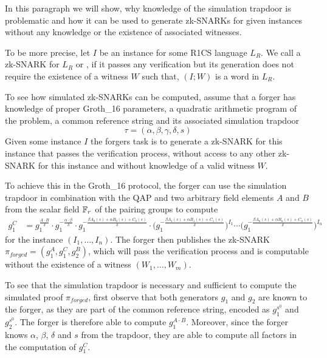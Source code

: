 In this paragraph we will show, why knowledge of the simulation trapdoor is problematic and how it can be used to generate zk-SNARKs for given instances without any knowledge or the existence of associated witnesses. 

To be more precise, let $I$ be an instance for some R1CS language $L_R$. We call a zk-SNARK for $L_R$  or , if it passes any verification but its generation does not require the existence of a witness $W$ such that,  $(I;W)$ is a word in $L_R$. 

To see how simulated zk-SNARKs can be computed, assume that a forger has knowledge of proper Groth\_16 parameters, a quadratic arithmetic program of the problem, a common reference string and its associated simulation trapdoor
\begin{equation}
\tau = (\alpha,\beta,\gamma,\delta,s)
\end{equation}
Given some instance $I$ the forgers task is to generate a zk-SNARK for this instance that passes the verification process, without access to any other zk-SNARK for this instance and without knowledge of a valid witness $W$.

To achieve this in the Groth\_16 protocol, the forger can use the simulation trapdoor in combination with the QAP and two arbitrary field elements $A$ and $B$ from the scalar field $\mathbb{F}_r$ of the pairing groups to compute 
\begin{align*}
g_1^C & = g_1^{\frac{A\cdot B}{\delta}}\cdot g_1^{-\frac{\alpha\cdot \beta}{\delta}}\cdot g_1^{-\frac{\beta A_0(s) + \alpha B_0(s)+ C_0(s)}{\delta}}\cdot \Big(g_1^{-\frac{\beta A_1(s) + \alpha B_1(s)+ C_1(s)}{\delta}}\Big)^{I_1}\cdots \Big(g_1^{-\frac{\beta A_n(s) + \alpha B_n(s)+ C_n(s)}{\delta}}\Big)^{I_n}\
\end{align*} 
for the instance $(I_1,\ldots,I_n)$. The forger then publishes the zk-SNARK $\pi_{forged} = (g_1^A, g_1^C, g_2^B)$, which will pass the verification process and is computable without the existence of a witness $(W_1,\ldots,W_m)$.

To see that the simulation trapdoor is necessary and sufficient to compute the simulated proof $\pi_{forged}$, first observe that both generators $g_1$ and $g_2$ are known to the forger, as they are part of the common reference string, encoded as $g_1^{s^0}$ and $g_2^{s^0}$. The forger is therefore able to compute $g_1^{A\cdot B}$. Moreover, since the forger knows $\alpha$, $\beta$, $\delta$ and $s$ from the trapdoor, they are able to compute all factors in the computation of $g_1^C$.

